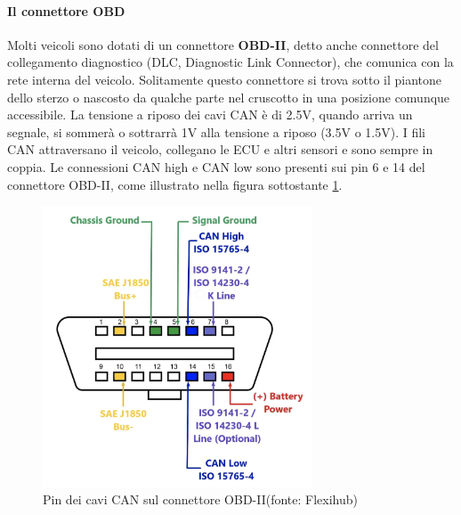 \documentclass[12pt, a4paper, italian]{report}
\numberwithin{figure}{chapter}
\numberwithin{table}{chapter}
\begin{document}
\paragraph{Il connettore OBD} Molti veicoli sono dotati di un connettore \textbf{OBD-II}, detto anche connettore del collegamento diagnostico (DLC, Diagnostic Link Connector), che comunica con la rete interna del veicolo. Solitamente questo connettore si trova sotto il piantone dello sterzo o nascosto da qualche parte nel cruscotto in una posizione comunque accessibile.
La tensione a riposo dei cavi CAN è di 2.5V, quando arriva un segnale, si sommerà o sottrarrà 1V alla tensione a riposo  (3.5V o 1.5V). I fili CAN attraversano il veicolo, collegano le ECU e altri sensori e sono sempre in coppia. Le connessioni CAN high e CAN low sono presenti sui pin 6 e 14 del connettore OBD-II, come illustrato nella figura sottostante \ref{fig:Connettore OBD}. \cite{manualeHacker}


\begin{figure}[h]
  \centering
  \includegraphics[width=8cm]{Connettore_OBD-II.png}
  \caption{Pin dei cavi CAN sul connettore OBD-II\protect\footnotemark (fonte: Flexihub)}
  \label{fig:Connettore OBD}
\end{figure}
\end{document}

